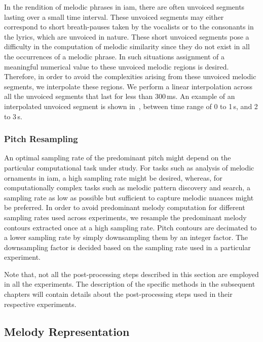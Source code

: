 {In the rendition of melodic phrases in \gls{iam}, there are often unvoiced segments lasting over a small time interval. These unvoiced segments may either correspond to short breath-pauses taken by the vocalists or to the consonants in the lyrics, which are unvoiced in nature. These short unvoiced segments pose a difficulty in the computation of melodic similarity since they do not exist in all the occurrences of a melodic phrase. In such situations assignment of a meaningful numerical value to these unvoiced melodic regions is desired. Therefore, in order to avoid the complexities arising from these unvoiced melodic segments, we interpolate these regions. We perform a linear interpolation across all the unvoiced segments that last for less than 300\,ms. An example of an interpolated unvoiced segment is shown in~, between time range of 0 to 1\,s, and 2 to 3\,s.

\subsubsection{Pitch Resampling}
\label{sec:data_processing_pitch_resampling}

An optimal sampling rate of the predominant pitch might depend on the particular computational task under study. For tasks such as analysis of melodic ornaments in \gls{iam}, a high sampling rate might be desired, whereas, for computationally complex tasks such as melodic pattern discovery and search, a sampling rate as low as possible but sufficient to capture melodic nuances might be preferred. In order to avoid predominant melody computation for different sampling rates used across experiments, we resample the predominant melody contours extracted once at a high sampling rate. Pitch contours are decimated to a lower sampling rate by simply downsampling them by an integer factor. The downsampling factor is decided based on the sampling rate used in a particular experiment.

Note that, not all the post-processing steps described in this section are employed in all the experiments. The description of the specific methods in the subsequent chapters will contain details about the post-processing steps used in their respective experiments.


\subsection{Melody Representation} 
\label{sec:pre_processing_melody_representation}

}
